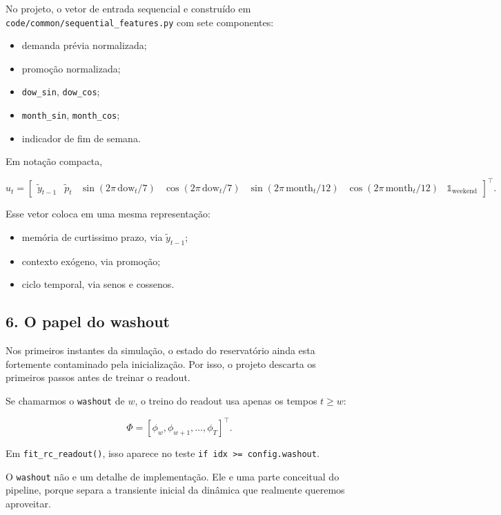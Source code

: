 \documentclass[12pt]{article}
\providecommand{\tightlist}{%
          \setlength{\itemsep}{0pt}\setlength{\parskip}{0pt}}
\begin{document}
No projeto, o vetor de entrada sequencial e construído em \texttt{code/common/sequential\_features.py} com sete componentes:

\begin{itemize}
\tightlist
\item
  demanda prévia normalizada;
\item
  promoção normalizada;
\item
  \texttt{dow\_sin}, \texttt{dow\_cos};
\item
  \texttt{month\_sin}, \texttt{month\_cos};
\item
  indicador de fim de semana.
\end{itemize}

Em notação compacta,

\[
u_t =
\begin{bmatrix}
\widetilde{y}_{t-1} &
\widetilde{p}_t &
\sin(2\pi \, \mathrm{dow}_t / 7) &
\cos(2\pi \, \mathrm{dow}_t / 7) &
\sin(2\pi \, \mathrm{month}_t / 12) &
\cos(2\pi \, \mathrm{month}_t / 12) &
\mathbb{1}_{\mathrm{weekend}}
\end{bmatrix}^\top.
\]

Esse vetor coloca em uma mesma representação:

\begin{itemize}
\tightlist
\item
  memória de curtissimo prazo, via \(\widetilde{y}_{t-1}\);
\item
  contexto exógeno, via promoção;
\item
  ciclo temporal, via senos e cossenos.
\end{itemize}

\subsection{6. O papel do washout}\label{6-o-papel-do-washout}

Nos primeiros instantes da simulação, o estado do reservatório ainda esta fortemente contaminado pela inicialização. Por isso, o projeto descarta os primeiros passos antes de treinar o readout.

Se chamarmos o \texttt{washout} de \(w\), o treino do readout usa apenas os tempos \(t \ge w\):

\[
\Phi = [\phi_w, \phi_{w+1}, \dots, \phi_T]^\top.
\]

Em \texttt{fit\_rc\_readout()}, isso aparece no teste \texttt{if\ idx\ \textgreater{}=\ config.washout}.

O \texttt{washout} não e um detalhe de implementação. Ele e uma parte conceitual do pipeline, porque separa a transiente inicial da dinâmica que realmente queremos aproveitar.
\end{document}
